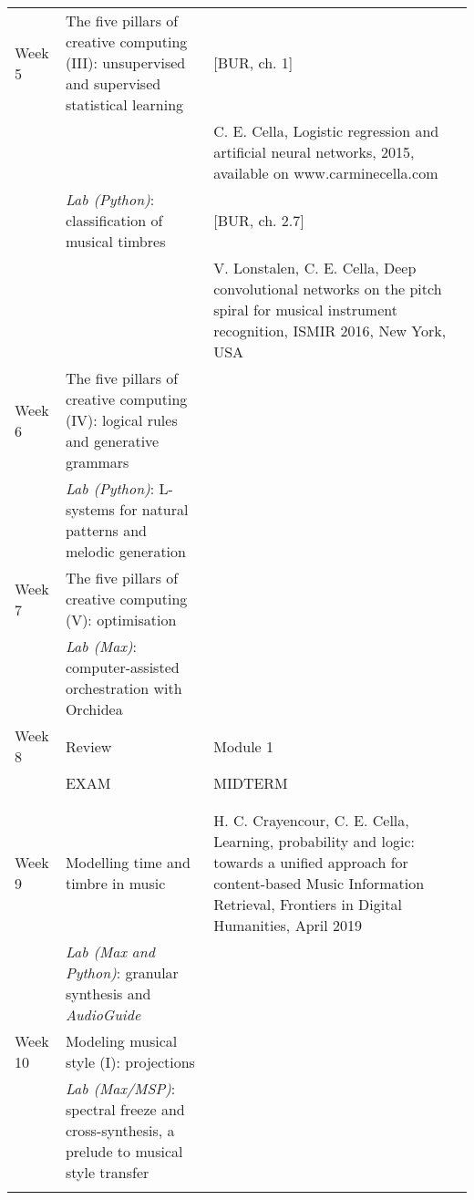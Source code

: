 \documentclass[letterpaper]{inzane_syllabus} %
\begin{document}
\begin{center}
\begin{tabularx}{\textwidth}{p{2cm}p{8cm} @{\hskip 0.5cm} p{9.5cm}}
Week 5 & The five pillars of creative computing (III): unsupervised and supervised statistical learning & [BUR, ch. 1]\\

& & C. E. Cella, Logistic regression and artificial neural networks, 2015, available on www.carminecella.com \\

& \emph{Lab (Python)}: classification of musical timbres & [BUR, ch. 2.7] \\

& & V. Lonstalen, C. E. Cella, Deep convolutional networks on the pitch spiral for musical instrument recognition, ISMIR 2016, New York, USA\\

\arrayrulecolor{maingray}\hline

Week 6 & The five pillars of creative computing (IV): logical rules and generative grammars&  \\

 &  \emph{Lab (Python)}: L-systems for natural patterns and melodic generation & \\
 \arrayrulecolor{maingray}\hline
 
 Week 7 & The five pillars of creative computing (V): optimisation &  \\
 
 & \emph{Lab (Max)}: computer-assisted orchestration with Orchidea &  \\
 \arrayrulecolor{maingray}\hline

 Week 8 & Review & Module 1 \\
 &EXAM &  MIDTERM \\
& & \\ 
 \arrayrulecolor{myCOLOR}\hline
\multicolumn{2}{l}{\textbf{\textcolor{myCOLOR}{\large MODULE 2: Transformations }}} \\
\hline

Week 9 & Modelling time and timbre in music & H. C. Crayencour, C. E. Cella, Learning, probability and logic: towards a unified approach for content-based Music Information Retrieval, Frontiers in Digital Humanities, April 2019 \\

& \emph{Lab (Max and Python)}: granular synthesis and \emph{AudioGuide} &  \\
\arrayrulecolor{maingray}\hline

Week 10 & Modeling musical style (I): projections &  \\

&   \emph{Lab (Max/MSP)}: spectral freeze and cross-synthesis, a prelude to musical style transfer &  \\
\arrayrulecolor{maingray}\hline


\end{tabularx}
\end{center}
\end{document}
